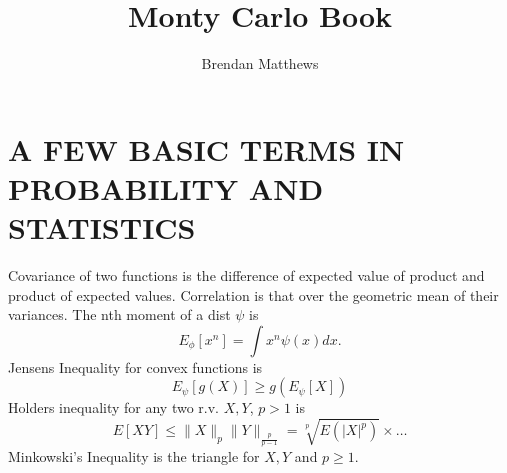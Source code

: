 \newcommand{\quo}{/ _\sim}
\newcommand{\pa}{\partial}
\newcommand{\lb}{\left}
\newcommand{\rb}{\right}
\newcommand{\aps}{\alpha_S}
\newcommand{\apl}{\alpha_L}
\newcommand{\tdd}{\frac{d^2T}{dx^2}}
\newcommand{\dx}{\frac{d}{dx}}
\newcommand{\seq}{(x_n)_{n \geq 1}}
\newcommand{\sseq}{(x_{n_k})_{k \geq 1}}
\newcommand{\fseq}{(f_n)_{n \geq 1}}
\newcommand{\elll}{\ell^{\infty}(\N)}
\newcommand{\norm}{{\|.\|}}
\newcommand{\inner}{\langle .,. \rangle}
\newcommand*\dd{\, \mathop{}\!\mathrm{d}}
\newcommand*\DD[1]{\, \mathop{}\!\mathrm{d^#1}}
\newcommand{\Ga}[1]{\frac{1}{\sqrt{2\pi\sigma^2}} e^{-\frac{\left(#1\right)^2}{2\sigma^2}}}
\usepackage{color}
\newcommand*\autoop{\left(}
\newcommand*\autocp{\right)}
\newcommand*\autoob{\left[}
\newcommand*\autocb{\right]}
\DeclareRobustCommand*\{{\ifmmode \left\lbrace \else \textbraceleft \fi }
\DeclareRobustCommand*\}{\ifmmode \right\rbrace \else \textbraceright \fi }
\AtBeginDocument {%
   \mathcode`( 32768
   \mathcode`) 32768
   \mathcode`[ 32768
   \mathcode`] 32768
   \begingroup
       \lccode`\~`(
       \lowercase{%
   \endgroup
       \let~\autoop
   }\begingroup
       \lccode`\~`)
       \lowercase{%
   \endgroup
       \let~\autocp
   }\begingroup
       \lccode`\~`[
       \lowercase{%
   \endgroup
       \let~\autoob
   }\begingroup
       \lccode`\~`]
       \lowercase{%
   \endgroup
       \let~\autocb
   }}


\makeatletter
%
\makeatother
\author{Brendan Matthews}
\title{Monty Carlo Book}

\section{A FEW BASIC TERMS IN PROBABILITY AND STATISTICS}
Covariance of two functions is the difference of expected value of product and product of expected values.
Correlation is that over the geometric mean of their variances. The nth moment of a dist $\psi$ is $$
E_{\phi}[x^n] = \int x^n \psi(x)dx.
$$
Jensens Inequality for convex functions is $$
E_{\psi}[g(X)] \geq g(E_\psi[X])
$$
Holders inequality for any two r.v. $X,Y$, $p>1$ is $$
E[XY] \leq \| X \|_p \|Y\|_{\frac{p}{p-1}} = \sqrt[p]{E(|X|^p)} \times \hdots
$$
Minkowski's Inequality is the triangle for $X,Y$ and $p \geq 1$.

